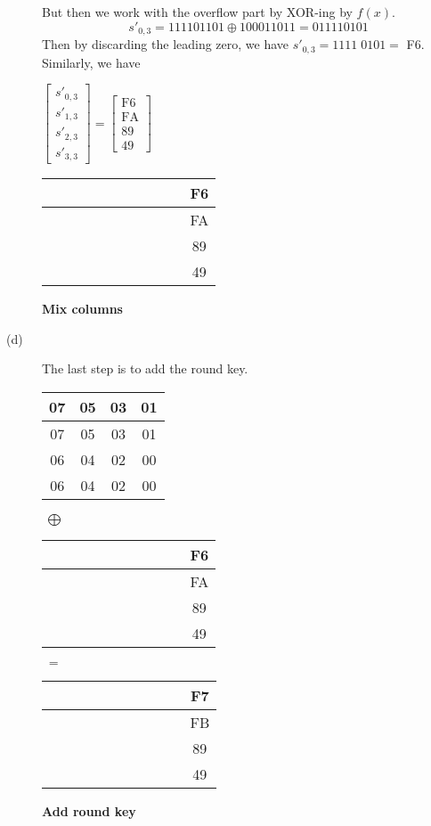 \documentclass[../hw_sols.tex]{subfiles}
\begin{document}
\begin{solution}
\begin{description}
But then we work with the overflow part by XOR-ing by $f(x)$.
	$$s'_{0,3} = 111101101 \oplus 100011011 = 011110101$$
Then by discarding the leading zero, we have $s'_{0,3} = 1111 \; 0101 =$ F6. 
Similarly, we have
	\begin{center}
	$\begin{bmatrix}
		s'_{0,3} \\ s'_{1,3} \\ s'_{2,3} \\ s'_{3,3}
	\end{bmatrix} 
	= 
	\begin{bmatrix}
		\text{F6} \\ \text{FA} \\ 89 \\ 49
	\end{bmatrix}$
	\qquad {\huge $\Rightarrow$} \qquad
	\begin{tabular}{| c | c | c | c |}
		\hline
		\ \ \ \ & \ \ \ \ & \ \ \ \ & F6 \\ \hline
		& & & FA \\ \hline
		& & & 89 \\ \hline
		& & & 49 \\ \hline
	\end{tabular} \quad \textbf{Mix columns}
	\end{center}

\item[(d)] The last step is to add the round key.
	\begin{center}
	\begin{tabular}{| c | c | c | c |}
		\hline
		07 & 05 & 03 & 01 \\ \hline
		07 & 05 & 03 & 01 \\ \hline
		06 & 04 & 02 & 00 \\ \hline
		06 & 04 & 02 & 00 \\ \hline
	\end{tabular}
	$\; \bigoplus \;$
	\begin{tabular}{| c | c | c | c |}
		\hline
		\ \ \ \ & \ \ \ \ & \ \ \ \ & F6 \\ \hline
		& & & FA \\ \hline
		& & & 89 \\ \hline
		& & & 49 \\ \hline
	\end{tabular}
	$\; = \;$
	\begin{tabular}{| c | c | c | c |}
		\hline
		\ \ \ \ & \ \ \ \ & \ \ \ \ & F7 \\ \hline
		& & & FB \\ \hline
		& & & 89 \\ \hline
		& & & 49 \\ \hline
	\end{tabular} \quad \textbf{Add round key}
	\end{center}

\end{description}

\end{solution}
\end{document}
